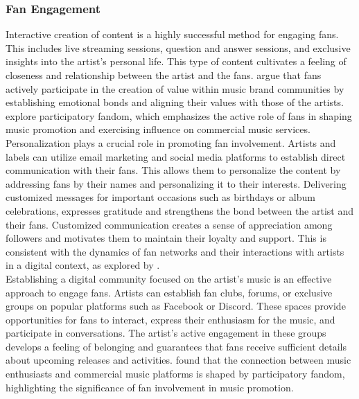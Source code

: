 \subsubsection{Fan Engagement}
Interactive creation of content is a highly successful method for engaging fans. This includes live streaming sessions, question and answer sessions, and exclusive insights into the artist's personal life. This type of content cultivates a feeling of closeness and relationship between the artist and the fans. \textcite{edlom21} argue that fans actively participate in the creation of value within music brand communities by establishing emotional bonds and aligning their values with those of the artists. \textcite{lee20} explore participatory fandom, which emphasizes the active role of fans in shaping music promotion and exercising influence on commercial music services. \\

Personalization plays a crucial role in promoting fan involvement. Artists and labels can utilize email marketing and social media platforms to establish direct communication with their fans. This allows them to personalize the content by addressing fans by their names and personalizing it to their interests. Delivering customized messages for important occasions such as birthdays or album celebrations, expresses gratitude and strengthens the bond between the artist and their fans. Customized communication creates a sense of appreciation among followers and motivates them to maintain their loyalty and support. This is consistent with the dynamics of fan networks and their interactions with artists in a digital context, as explored by \textcite{edlom21}. \\

Establishing a digital community focused on the artist's music is an effective approach to engage fans. Artists can establish fan clubs, forums, or exclusive groups on popular platforms such as Facebook or Discord. These spaces provide opportunities for fans to interact, express their enthusiasm for the music, and participate in conversations. The artist's active engagement in these groups develops a feeling of belonging and guarantees that fans receive sufficient details about upcoming releases and activities. \textcite{lee20} found that the connection between music enthusiasts and commercial music platforms is shaped by participatory fandom, highlighting the significance of fan involvement in music promotion. \\

